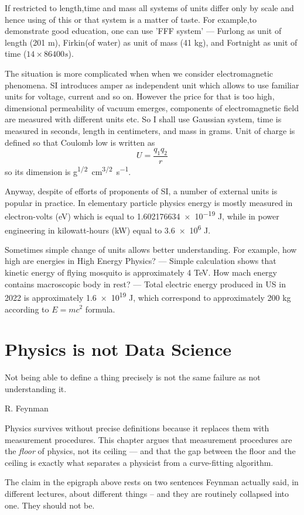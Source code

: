 If restricted to length,time and mass all systems of units  differ only by
scale and hence using of this or that system is a matter of taste. For
example,to demonstrate good education, one can use 'FFF system' --- Furlong as
unit of length (201 m), Firkin(of water) as unit of mass (41 kg), and Fortnight
as unit of time ($ 14\times 86400 s $). 

The situation is more complicated when when we consider electromagnetic
phenomena. SI introduces amper as independent unit which allows to use familiar
units for voltage, current and so on. However the price for that is too high,
dimensional permeability of vacuum emerges, components of electromagnetic field
are measured with different units etc. So I shall use Gaussian system, time is
measured in seconds, length in centimeters, and mass in grams. Unit of charge
is defined so that Coulomb low is written as \[ U= \frac{q_1 q_2}{r} \] so its
dimension is \unit{g^{1/2}.cm^{3/2}.s^{-1}}. 

Anyway, despite of efforts of proponents of SI, a number of external units is
popular in practice. In elementary particle physics energy is mostly measured
in electron-volts (\unit{eV}) which is equal to  \num{1.602176634e-19} J, while
in power engineering  in kilowatt-hours (\unit{kW}) equal to \num{3.6e6} J.

Sometimes simple change of units allows better understanding. For example, 
how high are energies in High Energy Physics? --- Simple calculation shows
 that kinetic energy of flying mosquito is approximately 4
\unit{TeV}. How mach energy contains macroscopic body in rest? ---
Total electric energy produced in US in 2022 is approximately
\num{1.6e19} J, which correspond to approximately 200 \unit{kg} according to $
E=m c^2 $ formula.

\section{Physics is not Data Science}
\label{sec:rm-pds}

\epigraph{Not being able to define a thing precisely is not the same failure 
as not understanding it.}{ R. Feynman}
 Physics survives without precise definitions because it replaces them with
 measurement procedures. This chapter argues that measurement procedures are
 the \emph{floor} of physics, not its ceiling --- and that the gap between the
 floor and the ceiling is exactly what separates a physicist from a
 curve-fitting algorithm.

The claim in the epigraph above rests on two sentences Feynman actually said,
in different lectures, about different things -- and they are routinely
collapsed into one. They should not be.

